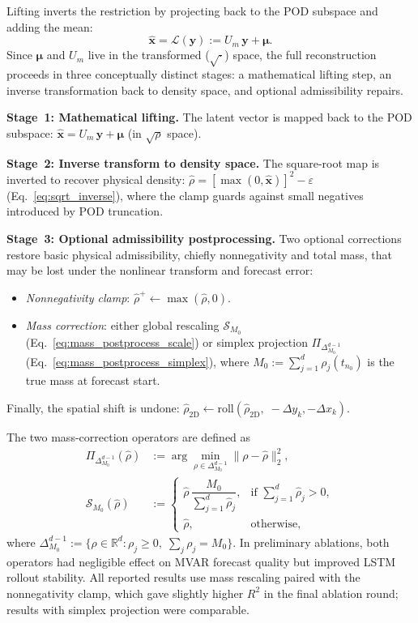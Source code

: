 Lifting inverts the restriction by projecting back to the POD subspace and
adding the mean:
\begin{equation}
  \hat{\mathbf{x}} = \mathcal{L}(\mathbf{y})
  := U_m\,\mathbf{y} + \boldsymbol{\mu}.
  \label{eq:lifting}
\end{equation}
Since $\boldsymbol{\mu}$ and $U_m$ live in the transformed
($\sqrt{\cdot}$) space, the full reconstruction proceeds in three
conceptually distinct stages: a mathematical lifting step, an inverse
transformation back to density space, and optional admissibility repairs.

\noindent\textbf{Stage~1: Mathematical lifting.}
The latent vector is mapped back to the POD subspace:
$\hat{\mathbf{x}} = U_m\,\mathbf{y}+\boldsymbol{\mu}$
(in $\sqrt{\rho}$ space).

\noindent\textbf{Stage~2: Inverse transform to density space.}
The square-root map is inverted to recover physical density:
$\hat\rho = [\max(0,\hat{\mathbf{x}})]^2 - \varepsilon$
(Eq.~\ref{eq:sqrt_inverse}), where the clamp guards against small
negatives introduced by POD truncation.

\noindent\textbf{Stage~3: Optional admissibility postprocessing.}
Two optional corrections restore basic physical admissibility, chiefly
nonnegativity and total mass, that may be lost under the nonlinear
transform and forecast error:
\begin{itemize}[nosep]
  \item \emph{Nonnegativity clamp}: $\hat\rho^{+} \leftarrow \max(\hat\rho,0)$.
  \item \emph{Mass correction}: either global rescaling
        $\mathcal{S}_{M_0}$ (Eq.~\ref{eq:mass_postprocess_scale}) or
        simplex projection $\Pi_{\Delta^{d-1}_{M_0}}$ (Eq.~\ref{eq:mass_postprocess_simplex}),
        where $M_0 := \sum_{j=1}^{d}\rho_j(t_{n_0})$ is the true mass
        at forecast start.
\end{itemize}
Finally, the spatial shift is undone:
$\hat\rho_{2\mathrm{D}}
\leftarrow \mathrm{roll}(\hat\rho_{2\mathrm{D}},\;
-\Delta y_k,-\Delta x_k)$.

The two mass-correction operators are defined as
{\setlength{\abovedisplayskip}{5pt}
\setlength{\belowdisplayskip}{5pt}
\begin{align}
  \Pi_{\Delta^{d-1}_{M_0}}(\hat\rho)
  &:= \arg\min_{\rho\in\Delta^{d-1}_{M_0}}
  \|\rho-\hat\rho\|_2^2,
  \label{eq:mass_postprocess_simplex}\\
  \mathcal{S}_{M_0}(\hat\rho)
  &:=
  \begin{cases}
    \hat\rho\,\dfrac{M_0}{\sum_{j=1}^{d}\hat\rho_j},
    & \text{if }\sum_{j=1}^{d}\hat\rho_j > 0,\\[6pt]
    \hat\rho,
    & \text{otherwise,}
  \end{cases}
  \label{eq:mass_postprocess_scale}
\end{align}
}
where $\Delta^{d-1}_{M_0}:=\{\rho\in\mathbb{R}^d:\rho_j\ge0,\;\sum_j\rho_j=M_0\}$.
In preliminary ablations, both operators had negligible effect on MVAR
forecast quality but improved LSTM rollout stability.
All reported results use mass rescaling paired with
the nonnegativity clamp, which gave slightly higher $R^2$ in the final
ablation round; results with simplex projection were comparable.

